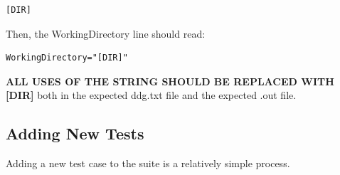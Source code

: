 \documentclass[12pt]{article}
\begin{document}
\begin{lstlisting}
[DIR]
\end{lstlisting}


Then, the WorkingDirectory line should read:

\begin{lstlisting}
WorkingDirectory="[DIR]" 
\end{lstlisting}

\textbf{ALL USES OF THE STRING SHOULD BE REPLACED WITH [DIR]} both in the expected 
ddg.txt file and the expected .out file.


\subsection{Adding New Tests}
\label{sec:add_tests}

Adding a new test case to the suite is a relatively simple process. 
\end{document}
